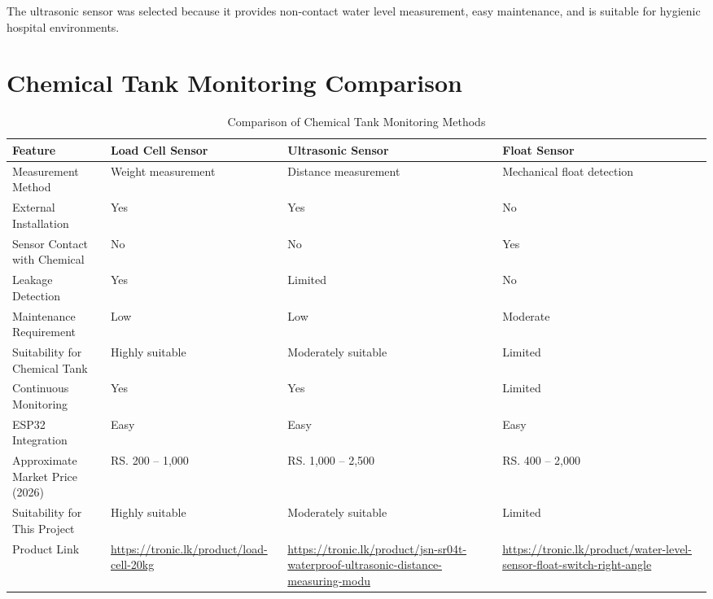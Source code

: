 \documentclass[12pt,a4paper]{report}
\begin{document}
The ultrasonic sensor was selected because it provides non-contact water level measurement, easy maintenance, and is suitable for hygienic hospital environments.

\section{Chemical Tank Monitoring Comparison}

\begin{table}[H]
\centering
\small
\begin{tabularx}{\textwidth}{|p{3cm}|>{\raggedright\arraybackslash}X|>{\raggedright\arraybackslash}X|>{\raggedright\arraybackslash}X|}
\hline
\textbf{Feature} & \textbf{Load Cell Sensor} & \textbf{Ultrasonic Sensor} & \textbf{Float Sensor} \\
\hline

Measurement Method &
Weight measurement &
Distance measurement &
Mechanical float detection \\
\hline

External Installation &
Yes &
Yes &
No \\
\hline

Sensor Contact with Chemical &
No &
No &
Yes \\
\hline

Leakage Detection &
Yes &
Limited &
No \\
\hline

Maintenance Requirement &
Low &
Low &
Moderate \\
\hline

Suitability for Chemical Tank &
Highly suitable &
Moderately suitable &
Limited \\
\hline

Continuous Monitoring &
Yes &
Yes &
Limited \\
\hline

ESP32 Integration &
Easy &
Easy &
Easy \\
\hline

Approximate Market Price (2026) &
RS. 200 -- 1,000 &
RS. 1,000 -- 2,500 &
RS. 400 -- 2,000 \\
\hline

Suitability for This Project &
Highly suitable &
Moderately suitable &
Limited \\
\hline

Product Link &
\url{https://tronic.lk/product/load-cell-20kg} &
\url{https://tronic.lk/product/jsn-sr04t-waterproof-ultrasonic-distance-measuring-modu} &
\url{https://tronic.lk/product/water-level-sensor-float-switch-right-angle} \\
\hline

\end{tabularx}
\caption{Comparison of Chemical Tank Monitoring Methods}
\end{table}
\end{document}

